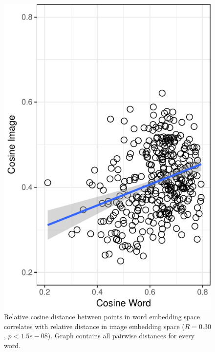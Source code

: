 \documentclass[10pt, letterpaper]{article}
\newenvironment{CodeChunk}{}{}
\begin{document}
\begin{CodeChunk}
\begin{figure}[tb]
\includegraphics{figs/pairwise-corr-1} \caption[Relative cosine distance between points in word embedding space correlates with relative distance in image embedding space ($R = 0.30$, $p < 1.5e-08$)]{Relative cosine distance between points in word embedding space correlates with relative distance in image embedding space ($R = 0.30$, $p < 1.5e-08$). Graph contains all pairwise distances for every word.}\label{fig:pairwise-corr}
\end{figure}
\end{CodeChunk}
\end{document}
